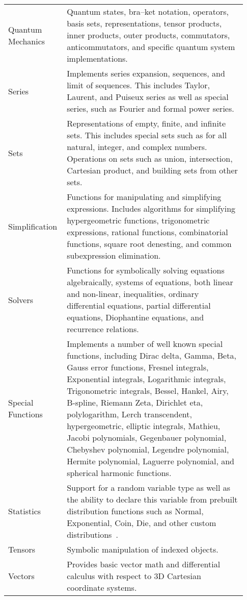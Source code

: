 \begin{longtable}[htbc]{p{0.20\linewidth}p{0.73\linewidth}}
Quantum Mechanics & Quantum states, bra--ket notation, operators, basis sets,
representations, tensor products, inner products, outer products, commutators,
anticommutators, and specific quantum system implementations.\\

Series & Implements series expansion, sequences, and limit of sequences.
This includes Taylor, Laurent, and Puiseux series as well as special series, such
as Fourier and formal power series.\\

Sets & Representations of empty, finite, and infinite sets. This includes
special sets such as for all natural, integer, and complex numbers. Operations
on sets such as union, intersection, Cartesian product, and building sets from
other sets.\\

Simplification & Functions for manipulating and simplifying expressions.
Includes algorithms for simplifying hypergeometric functions, trigonometric
expressions, rational functions, combinatorial functions, square root
denesting, and common subexpression elimination.\\

Solvers & Functions for symbolically solving equations algebraically, systems
of equations, both linear and non-linear, inequalities, ordinary differential
equations, partial differential equations, Diophantine equations, and
recurrence relations.\\

Special Functions & Implements a number of well known special functions,
including Dirac delta, Gamma, Beta, Gauss error functions, Fresnel integrals,
Exponential integrals, Logarithmic integrals, Trigonometric integrals, Bessel,
Hankel, Airy, B-spline, Riemann Zeta, Dirichlet eta, polylogarithm, Lerch
transcendent, hypergeometric, elliptic integrals, Mathieu, Jacobi polynomials,
Gegenbauer polynomial, Chebyshev polynomial, Legendre polynomial, Hermite
polynomial, Laguerre polynomial, and
spherical harmonic functions.\\

Statistics & Support for a random variable type as well as the ability to
declare this variable from prebuilt distribution functions such as
Normal, Exponential, Coin, Die, and other custom distributions~\cite{StatsMRocklin}.\\

Tensors & Symbolic manipulation of indexed objects.\\

Vectors & Provides basic vector math and differential calculus with respect
to 3D Cartesian coordinate systems.\\
\bottomrule

\end{longtable}

